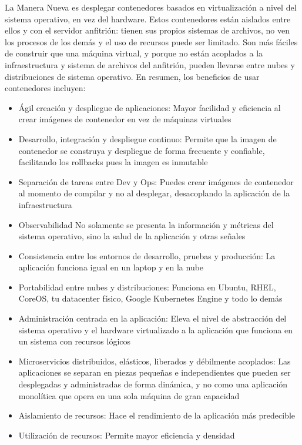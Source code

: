 \documentclass[12pt]{article}
\begin{document}
La Manera Nueva es desplegar contenedores basados en virtualización a nivel del sistema operativo, en vez del hardware. Estos contenedores están aislados entre ellos y con el servidor anfitrión: tienen sus propios sistemas de archivos, no ven los procesos de los demás y el uso de recursos puede ser limitado. Son más fáciles de construir que una máquina virtual, y porque no están acoplados a la infraestructura y sistema de archivos del anfitrión, pueden llevarse entre nubes y distribuciones de sistema operativo.
En resumen, los beneficios de usar contenedores incluyen:
\begin{itemize}
\item Ágil creación y despliegue de aplicaciones: Mayor facilidad y eficiencia al crear imágenes de contenedor en vez de máquinas virtuales
\item Desarrollo, integración y despliegue continuo: Permite que la imagen de contenedor se construya y despliegue de forma frecuente y confiable, facilitando los rollbacks pues la imagen es inmutable
\item Separación de tareas entre Dev y Ops: Puedes crear imágenes de contenedor al momento de compilar y no al desplegar, desacoplando la aplicación de la infraestructura
\item Observabilidad No solamente se presenta la información y métricas del sistema operativo, sino la salud de la aplicación y otras señales
\item Consistencia entre los entornos de desarrollo, pruebas y producción: La aplicación funciona igual en un laptop y en la nube
\item Portabilidad entre nubes y distribuciones: Funciona en Ubuntu, RHEL, CoreOS, tu datacenter físico, Google Kubernetes Engine y todo lo demás
\item Administración centrada en la aplicación: Eleva el nivel de abstracción del sistema operativo y el hardware virtualizado a la aplicación que funciona en un sistema con recursos lógicos
\item Microservicios distribuidos, elásticos, liberados y débilmente acoplados: Las aplicaciones se separan en piezas pequeñas e independientes que pueden ser desplegadas y administradas de forma dinámica, y no como una aplicación monolítica que opera en una sola máquina de gran capacidad
\item Aislamiento de recursos: Hace el rendimiento de la aplicación más predecible
\item Utilización de recursos: Permite mayor eficiencia y densidad
\end{itemize}
\cite{Kubernetes}
\end{document}
